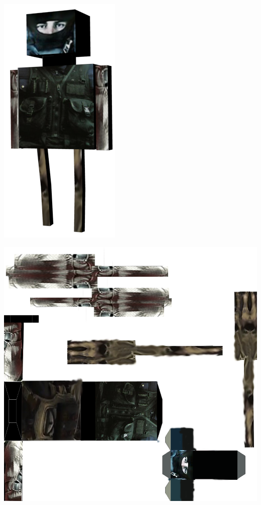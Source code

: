 \documentclass{article}
\begin{document}
\begin{center}
\includegraphics[scale=0.8]{ennemidehorsblend.png}
\end{center}
\begin{center}
\includegraphics[scale=0.2]{ennemidehors.png}
\end{center}
\end{document}
